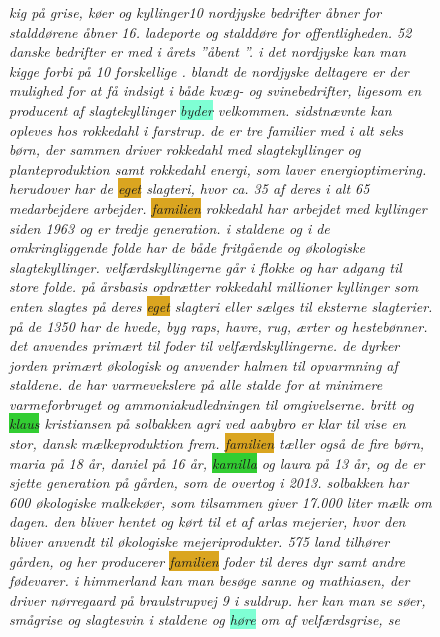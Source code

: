 \begin{figure}[h]
	\begin{tcolorbox}[boxsep=5pt, top=0pt, bottom=0pt, left=0pt, right=0pt]
		\emph{
			kig på grise, køer og kyllinger10 \colorbox{Peach}{nordjyske} bedrifter åbner  for stalddørene  åbner  16.  ladeporte og stalddøre for offentligheden. 52 danske bedrifter er med i årets ”åbent ”. i det \colorbox{Peach}{nordjyske} kan man kigge forbi på 10 \colorbox{Peach}{forskellige} . blandt de \colorbox{Peach}{nordjyske} deltagere er der \colorbox{Peach}{mulighed} for at få indsigt i både kvæg- og svinebedrifter, \colorbox{Peach}{ligesom} en producent af slagtekyllinger \colorbox{Aquamarine}{byder} velkommen. sidstnævnte kan opleves hos rokkedahl i farstrup. de er tre familier med i alt \colorbox{Peach}{seks} børn, der sammen driver rokkedahl  med slagtekyllinger og planteproduktion \colorbox{Peach}{samt} rokkedahl energi, som laver energioptimering. herudover har de \colorbox{Goldenrod}{eget} slagteri, hvor ca. 35 af deres i alt 65 \colorbox{Peach}{medarbejdere} arbejder. \colorbox{Goldenrod}{familien} rokkedahl har \colorbox{Peach}{arbejdet} med kyllinger siden 1963 og er tredje generation. i staldene og i de omkringliggende folde har de både fritgående og økologiske slagtekyllinger. velfærdskyllingerne går i flokke og har adgang til store folde. på årsbasis opdrætter rokkedahl  \colorbox{Peach}{millioner} kyllinger som enten slagtes på deres \colorbox{Goldenrod}{eget} slagteri eller sælges til eksterne slagterier. på de 1350  har de hvede, byg raps, havre, rug, ærter og hestebønner. det anvendes primært til foder til velfærdskyllingerne. de dyrker \colorbox{Peach}{jorden} primært økologisk og anvender halmen til opvarmning af staldene. de har varmevekslere på alle stalde for at minimere varmeforbruget og ammoniakudledningen til omgivelserne. britt og \colorbox{LimeGreen}{klaus} kristiansen på solbakken agri ved aabybro er \colorbox{Peach}{klar} til vise en stor, \colorbox{Peach}{dansk} mælkeproduktion frem. \colorbox{Goldenrod}{familien} tæller også de fire børn, maria på 18 år, daniel på 16 år, \colorbox{LimeGreen}{kamilla} og laura på 13 år, og de er sjette generation på gården, som de overtog i 2013. solbakken har 600 økologiske malkekøer, som tilsammen \colorbox{Peach}{giver} 17.000 liter mælk om dagen. den bliver hentet og kørt til et af arlas mejerier, hvor den bliver anvendt til økologiske mejeriprodukter. 575  \colorbox{Peach}{land} tilhører gården, og her producerer \colorbox{Goldenrod}{familien} foder til deres \colorbox{Peach}{dyr} \colorbox{Peach}{samt} andre fødevarer.  i himmerland kan man besøge sanne og  mathiasen, der driver nørregaard på braulstrupvej 9 i suldrup. her kan man se søer, smågrise og slagtesvin i staldene og \colorbox{Aquamarine}{høre} om  af velfærdsgrise, se }
\end{tcolorbox}
\end{figure}
